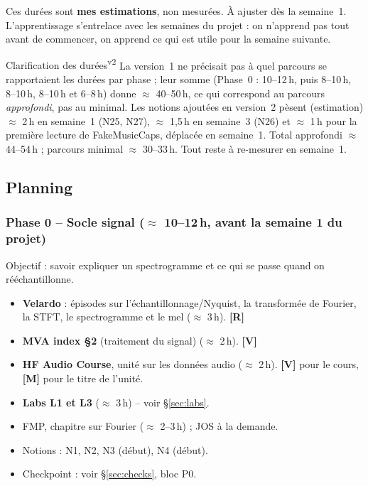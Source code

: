 \documentclass[11pt,a4paper]{article}
\newcommand{\sS}{\ding{72}}   %
\newcommand{\sO}{\ding{73}}   %
\newcommand{\lV}{\textbf{\textcolor{green!45!black}{[V]}}}
\newcommand{\lR}{\textbf{\textcolor{orange!80!black}{[R]}}}
\newcommand{\lM}{\textbf{\textcolor{red!70!black}{[M]}}}
\newcommand{\vtwot}{\textsuperscript{v2}}  %
\begin{document}
Ces durées sont \textbf{mes estimations}, non mesurées. À ajuster dès la semaine~1. L'apprentissage s'entrelace avec les semaines du projet : on n'apprend pas tout avant de commencer, on apprend ce qui est utile pour la semaine suivante.

\begin{corr}{Clarification des durées\vtwot}
La version~1 ne précisait pas à quel parcours se rapportaient les durées par phase ; leur somme (Phase~0 : 10--12\,h, puis 8--10\,h, 8--10\,h, 8--10\,h et 6--8\,h) donne $\approx$ 40--50\,h, ce qui correspond au parcours \emph{approfondi}, pas au minimal. Les notions ajoutées en version~2 pèsent (estimation) $\approx$ 2\,h en semaine~1 (N25, N27), $\approx$ 1,5\,h en semaine~3 (N26) et $\approx$ 1\,h pour la première lecture de FakeMusicCaps, déplacée en semaine~1. Total approfondi $\approx$ 44--54\,h ; parcours minimal $\approx$ 30--33\,h. Tout reste à re-mesurer en semaine~1.
\end{corr}

\subsection{Planning}

\subsubsection{Phase 0 -- Socle signal ($\approx$ 10--12\,h, avant la semaine 1 du projet)}
Objectif : savoir expliquer un spectrogramme et ce qui se passe quand on rééchantillonne.
\begin{itemize}
\item \textbf{\sS} \textbf{Velardo} : épisodes sur l'échantillonnage/Nyquist, la transformée de Fourier, la STFT, le spectrogramme et le mel ($\approx$ 3\,h). \lR
\item \textbf{\sS} \textbf{MVA index §2} (traitement du signal) ($\approx$ 2\,h). \lV
\item \textbf{\sS} \textbf{HF Audio Course}, unité sur les données audio ($\approx$ 2\,h). \lV{} pour le cours, \lM{} pour le titre de l'unité.
\item \textbf{\sS} \textbf{Labs L1 et L3} ($\approx$ 3\,h) -- voir §\ref{sec:labs}.
\item \textbf{\sO} FMP, chapitre sur Fourier ($\approx$ 2--3\,h) ; JOS à la demande.
\item Notions : N1, N2, N3 (début), N4 (début).
\item Checkpoint : voir §\ref{sec:checks}, bloc P0.
\end{itemize}
\end{document}
